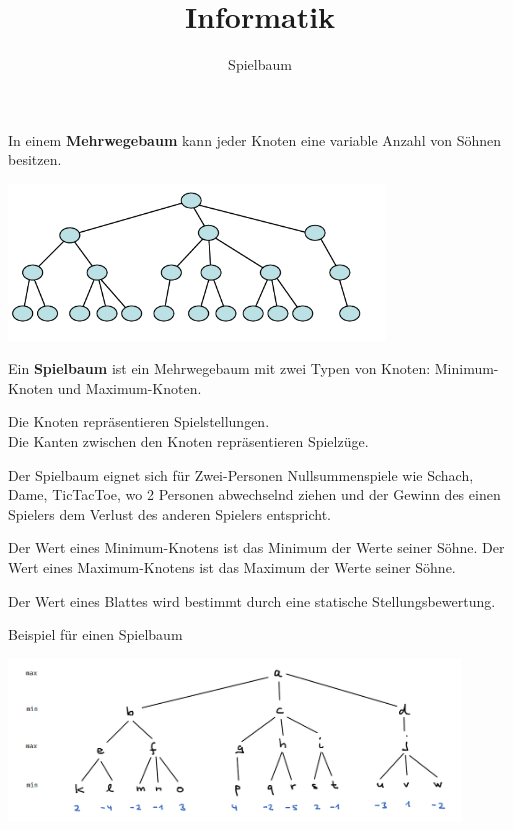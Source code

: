 \documentclass{beamer}
\begin{document}
\title{Informatik}   
\author{Spielbaum} 
\date{}
\frame{\titlepage} 
\small
\begin{frame}[fragile]

In einem \textbf{Mehrwegebaum} kann jeder Knoten eine variable Anzahl von Söhnen besitzen. 


\includegraphics[width=10cm]{bild1a.png} 

\end{frame}


\begin{frame}[fragile]
Ein \textbf{Spielbaum} ist ein Mehrwegebaum mit zwei Typen von Knoten: Minimum-Knoten und
Maximum-Knoten.  

Die Knoten repräsentieren Spielstellungen. \\
Die Kanten zwischen den Knoten repräsentieren Spielzüge.  \pause

Der Spielbaum eignet sich für Zwei-Personen Nullsummenspiele wie Schach, Dame, TicTacToe, wo 2 Personen
 abwechselnd ziehen und der Gewinn des einen Spielers dem Verlust des anderen Spielers entspricht. \pause
 
Der Wert eines Minimum-Knotens ist das Minimum der Werte seiner Söhne. 
Der Wert eines Maximum-Knotens ist das Maximum der Werte seiner Söhne.    

Der Wert eines Blattes wird bestimmt durch eine statische Stellungsbewertung.
\end{frame}

\begin{frame}[fragile]
Beispiel für einen Spielbaum

\includegraphics[width=12cm]{bild10.png} 

\end{frame}
\end{document}
